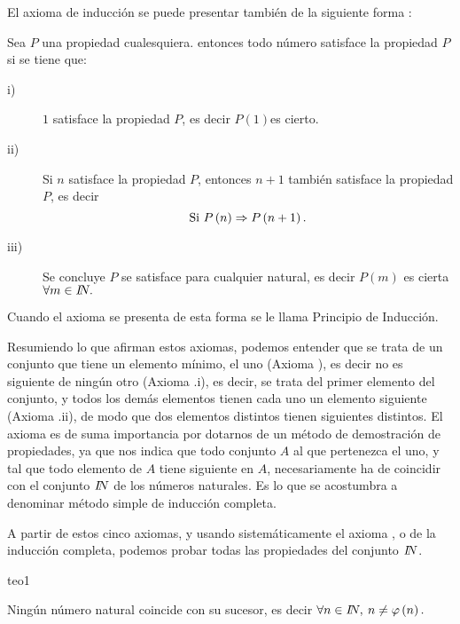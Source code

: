 El axioma de inducción se puede presentar también de la siguiente
forma :

Sea $P$ una propiedad cualesquiera. entonces todo número satisface
la propiedad $P$ si se tiene que:
\begin{description}
\item [{i)}] $1$ satisface la propiedad $P$, es decir $P\left(1\right)$es
cierto.
\item [{ii)}] Si $n$ satisface la propiedad $P$, entonces $n+1$ también
satisface la propiedad $P$, es decir 
\[
\mbox{Si \ensuremath{P\left(n\right)\Rightarrow P\left(n+1\right).}}
\]
\item [{iii)}] Se concluye $P$ se satisface para cualquier natural, es
decir $P\left(m\right)$ es cierta $\forall m\in\na.$ 
\end{description}
%
\begin{apunte}

%
Cuando el axioma se presenta de esta forma se le llama Principio de
Inducción. 

\end{apunte}

Resumiendo lo que afirman estos axiomas, podemos entender que se trata
de un conjunto que tiene un elemento mínimo, el uno (Axioma ),
es decir no es siguiente de ningún otro (Axioma .i), es
decir, se trata del primer elemento del conjunto, y todos los demás
elementos tienen cada uno un elemento siguiente (Axioma .ii),
de modo que dos elementos distintos tienen siguientes distintos. El
axioma  es de suma importancia por dotarnos de un
método de demostración de propiedades, ya que nos indica que todo
conjunto $A$ al que pertenezca el uno, y tal que todo elemento de
$A$ tiene siguiente en $A$, necesariamente ha de coincidir con el
conjunto $\na$ de los números naturales. Es lo que se acostumbra
a denominar método simple de inducción completa. 

A partir de estos cinco axiomas, y usando sistemáticamente el axioma
, o de la inducción completa, podemos probar todas
las propiedades del conjunto $\na$. 

\begin{teo}{}{teo1}

Ningún número natural coincide con su sucesor, es decir $\forall n\in\na,\:n\neq\varphi\left(n\right).$

\end{teo}

